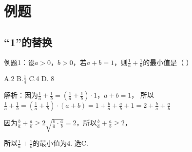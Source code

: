 \documentclass[a4paper,10pt]{ctexbook}
\begin{document}
\section{例题}

\subsection{“1”的替换}

例题1：设$a>0$，$b>0$，若$ a+b=1 $，则$ \frac{1}{a} + \frac{1}{b} $的最小值是（    ）

A.2 \quad B.$\frac{1}{4}$ \quad  C.4 \quad D. 8

解析：因为$\frac{1}{a}+\frac{1}{b}=(\frac{1}{a}+\frac{1}{b})\cdot1$，$a+b=1$，
所以$\frac{1}{a}+\frac{1}{b}=(\frac{1}{a}+\frac{1}{b})\cdot(a+b)=1+\frac{b}{a}+\frac{a}{b}+1=2+\frac{b}{a}+\frac{a}{b}$

因为$\frac{b}{a}+\frac{a}{b} \ge 2\sqrt{\frac{b}{a}\cdot\frac{a}{b}}=2$，所以$\frac{b}{a}+\frac{a}{b} \ge 2$，

所以$\frac{1}{a}+\frac{1}{b}$的最小值为4. 选C.

\end{document}
